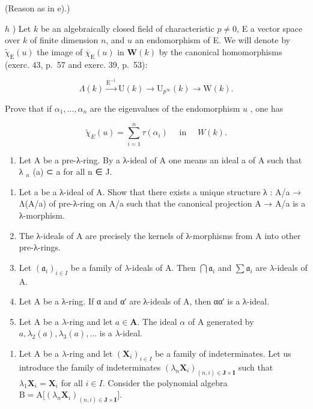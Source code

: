 (Reason as in e).)

\(h\) ) Let \(k\) be an algebraically closed field of characteristic \(p\ne0\), E a vector space over \(k\) of finite dimension \(n\), and \(u\) an endomorphism of E. We will denote by \(\tilde{\chi}_{\mathrm{E}}(u)\) the image of \(\overline{\chi}_{\mathrm{E}}(u)\) in \(\mathbf{W}(k)\) by the canonical homomorphisms (exerc. 43, p.~57 and exerc. 39, p.~53):

\[
\Lambda (k) \xrightarrow {\mathrm{E} ^ {- 1}} \mathrm{U} (k) \longrightarrow \mathrm{U} _ {p ^ {\infty}} (k) \longrightarrow \mathrm{W} (k).
\]

Prove that if \(\alpha_{1},\ldots,\alpha_{n}\) are the eigenvalues of the endomorphism \(u\) , one has

\[
\tilde {\chi} _ {E} (u) = \sum_ {i = 1} ^ {n} \tau (\alpha_ {i}) \quad \text { in } \quad W (k).
\]

\begin{enumerate}
\def\labelenumi{\arabic{enumi})}
\setcounter{enumi}{49}
\tightlist
\item
  Let A be a pre-λ-ring. By a λ-ideal of A one means an ideal a of A such that λ \(_{n}\) (a) ⊂ a for all n ∈ J.
\end{enumerate}

\begin{enumerate}
\def\labelenumi{\alph{enumi})}
\item
  Let a be a λ-ideal of A. Show that there exists a unique structure λ : A/a → Λ(A/a) of pre-λ-ring on A/a such that the canonical projection A → A/a is a λ-morphism.
\item
  The λ-ideals of A are precisely the kernels of λ-morphisms from A into other pre-λ-rings.
\item
  Let \((\mathfrak{a}_i)_{i\in I}\) be a family of \(\lambda\)-ideals of A. Then \(\bigcap \mathfrak{a}_i\) and \(\sum \mathfrak{a}_i\) are \(\lambda\)-ideals of A.
\item
  Let A be a λ-ring. If α and α′ are λ-ideals of A, then αα′ is a λ-ideal.
\item
  Let A be a \(\lambda\)-ring and let \(a \in \mathbf{A}\). The ideal \(\alpha\) of A generated by \(a, \lambda_2(a), \lambda_3(a), \ldots\) is a \(\lambda\)-ideal.
\end{enumerate}

\begin{enumerate}
\def\labelenumi{\arabic{enumi})}
\setcounter{enumi}{50}
\tightlist
\item
  Let A be a \(\lambda\)-ring and let \((\mathbf{X}_i)_{i\in I}\) be a family of indeterminates. Let us introduce the family of indeterminates \((\lambda_n\mathbf{X}_i)_{(n,i)\in \mathbf{J}\times \mathbf{I}}\) such that \(\lambda_1\mathbf{X}_i = \mathbf{X}_i\) for all \(i\in I\). Consider the polynomial algebra \(\mathrm{B} = \mathrm{A}\big[(\lambda_n\mathbf{X}_i)_{(n,i)\in \mathbf{J}\times \mathbf{I}}\big]\).
\end{enumerate}

